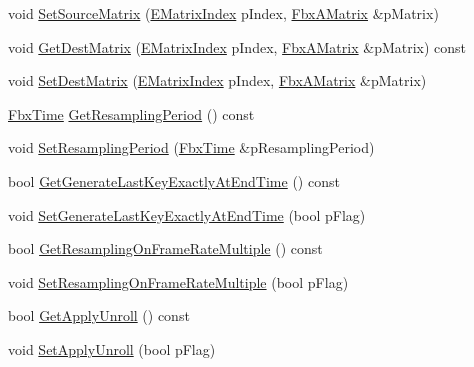 \begin{DoxyCompactItemize}
\item 
void \hyperlink{class_fbx_anim_curve_filter_matrix_converter_a51f8c45cecbe23a5df38bd0f2b4feb08}{Set\+Source\+Matrix} (\hyperlink{class_fbx_anim_curve_filter_matrix_converter_a41638d5acd6d14ef0f095ab75b18ee69}{E\+Matrix\+Index} p\+Index, \hyperlink{class_fbx_a_matrix}{Fbx\+A\+Matrix} \&p\+Matrix)
\item 
void \hyperlink{class_fbx_anim_curve_filter_matrix_converter_a5cd3e587cb299a3ae2d78e9c964a5ef0}{Get\+Dest\+Matrix} (\hyperlink{class_fbx_anim_curve_filter_matrix_converter_a41638d5acd6d14ef0f095ab75b18ee69}{E\+Matrix\+Index} p\+Index, \hyperlink{class_fbx_a_matrix}{Fbx\+A\+Matrix} \&p\+Matrix) const
\item 
void \hyperlink{class_fbx_anim_curve_filter_matrix_converter_a5eafea6927cc0698df3a1a9c2cdb3b7d}{Set\+Dest\+Matrix} (\hyperlink{class_fbx_anim_curve_filter_matrix_converter_a41638d5acd6d14ef0f095ab75b18ee69}{E\+Matrix\+Index} p\+Index, \hyperlink{class_fbx_a_matrix}{Fbx\+A\+Matrix} \&p\+Matrix)
\item 
\hyperlink{class_fbx_time}{Fbx\+Time} \hyperlink{class_fbx_anim_curve_filter_matrix_converter_a30366999bdf8a54362cb07415cb09d67}{Get\+Resampling\+Period} () const
\item 
void \hyperlink{class_fbx_anim_curve_filter_matrix_converter_ad32f07496ccaa59ed3fa575da58b5dc1}{Set\+Resampling\+Period} (\hyperlink{class_fbx_time}{Fbx\+Time} \&p\+Resampling\+Period)
\item 
bool \hyperlink{class_fbx_anim_curve_filter_matrix_converter_a2721fda063f33bb95358c60df9a935f7}{Get\+Generate\+Last\+Key\+Exactly\+At\+End\+Time} () const
\item 
void \hyperlink{class_fbx_anim_curve_filter_matrix_converter_a3f6bbf821eff2180bef5b63764d4a305}{Set\+Generate\+Last\+Key\+Exactly\+At\+End\+Time} (bool p\+Flag)
\item 
bool \hyperlink{class_fbx_anim_curve_filter_matrix_converter_a6f5d905229e996ddccfe96e2cd4454e3}{Get\+Resampling\+On\+Frame\+Rate\+Multiple} () const
\item 
void \hyperlink{class_fbx_anim_curve_filter_matrix_converter_a7b23dfad34cae6de4c7f20ea8c071633}{Set\+Resampling\+On\+Frame\+Rate\+Multiple} (bool p\+Flag)
\item 
bool \hyperlink{class_fbx_anim_curve_filter_matrix_converter_acf269bdba7f9526a1c957505cb3beb9c}{Get\+Apply\+Unroll} () const
\item 
void \hyperlink{class_fbx_anim_curve_filter_matrix_converter_abcfe379526feec5a8d3ffc9e3e435d66}{Set\+Apply\+Unroll} (bool p\+Flag)

\end{DoxyCompactItemize}
